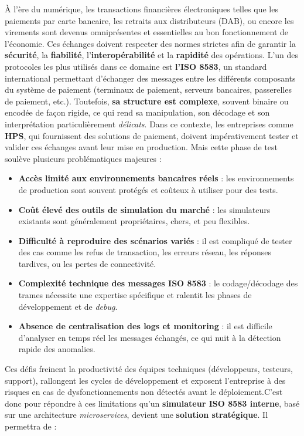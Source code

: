 À l’ère du numérique, les transactions financières électroniques telles que les paiements par carte bancaire, les retraits aux distributeurs (DAB), ou encore les virements sont devenus omniprésentes et essentielles au bon fonctionnement de l’économie. Ces échanges doivent respecter des normes strictes afin de garantir la \textbf{sécurité}, la \textbf{fiabilité}, l’\textbf{interopérabilité} et la \textbf{rapidité} des opérations.
L’un des protocoles les plus utilisés dans ce domaine est \textbf{l’ISO 8583}, un standard international permettant d’échanger des messages entre les différents composants du système de paiement (terminaux de paiement, serveurs bancaires, passerelles de paiement, etc.). Toutefois, \textbf{sa structure est complexe}, souvent binaire ou encodée de façon rigide, ce qui rend sa manipulation, son décodage et son interprétation particulièrement \textit{délicats}.
Dans ce contexte, les entreprises comme \textbf{HPS}, qui fournissent des solutions de paiement, doivent impérativement tester et valider ces échanges avant leur mise en production. Mais cette phase de test soulève plusieurs problématiques majeures :

\begin{itemize}
    [label=\textbullet] \item \textbf{Accès limité aux environnements bancaires réels} : les environnements de production sont souvent protégés et coûteux à utiliser pour des tests.
    \vspace{0.5cm}

    \item \textbf{Coût élevé des outils de simulation du marché} : les simulateurs existants sont généralement propriétaires, chers, et peu flexibles.
    \vspace{0.5cm}

    \item \textbf{Difficulté à reproduire des scénarios variés} : il est compliqué de tester des cas comme les refus de transaction, les erreurs réseau, les réponses tardives, ou les pertes de connectivité.
    \vspace{0.5cm}

    \item \textbf{Complexité technique des messages ISO 8583} : le codage/décodage des trames nécessite une expertise spécifique et ralentit les phases de développement et de \textit{debug}.
    \vspace{0.5cm}

    \item \textbf{Absence de centralisation des logs et monitoring} : il est difficile d'analyser en temps réel les messages échangés, ce qui nuit à la détection rapide des anomalies.
\end{itemize}
Ces défis freinent la productivité des équipes techniques (développeurs, testeurs, support), rallongent les cycles de développement et exposent l’entreprise à des risques en cas de dysfonctionnements non détectés avant le déploiement.C’est donc pour répondre à ces limitations qu’un \textbf{simulateur ISO 8583 interne}, basé sur une architecture \textit{microservices}, devient une \textbf{solution stratégique}. Il permettra de :

